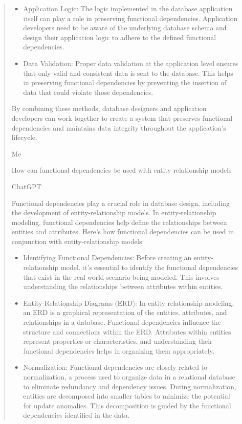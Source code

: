 \documentclass[11pt]{article}
\begin{document}
\begin{enumerate}
\begin{quotation}
\begin{itemize}
\item    Application Logic:
        The logic implemented in the database application itself can play a role in preserving functional dependencies. Application developers need to be aware of the underlying database schema and design their application logic to adhere to the defined functional dependencies.

\item    Data Validation:
        Proper data validation at the application level ensures that only valid and consistent data is sent to the database. This helps in preserving functional dependencies by preventing the insertion of data that could violate those dependencies.
\end{itemize}
By combining these methods, database designers and application developers can work together to create a system that preserves functional dependencies and maintains data integrity throughout the application's lifecycle.

Me

How can functional dependencies be used with entity relationship models

ChatGPT

Functional dependencies play a crucial role in database design, including the development of entity-relationship models. In entity-relationship modeling, functional dependencies help define the relationships between entities and attributes. Here's how functional dependencies can be used in conjunction with entity-relationship models:

\begin{itemize}
\item    Identifying Functional Dependencies:
        Before creating an entity-relationship model, it's essential to identify the functional dependencies that exist in the real-world scenario being modeled. This involves understanding the relationships between attributes within entities.

\item    Entity-Relationship Diagrams (ERD):
        In entity-relationship modeling, an ERD is a graphical representation of the entities, attributes, and relationships in a database. Functional dependencies influence the structure and connections within the ERD.
        Attributes within entities represent properties or characteristics, and understanding their functional dependencies helps in organizing them appropriately.

\item    Normalization:
        Functional dependencies are closely related to normalization, a process used to organize data in a relational database to eliminate redundancy and dependency issues.
        During normalization, entities are decomposed into smaller tables to minimize the potential for update anomalies. This decomposition is guided by the functional dependencies identified in the data.


\end{itemize}
\end{quotation}
\end{enumerate}
\end{document}
